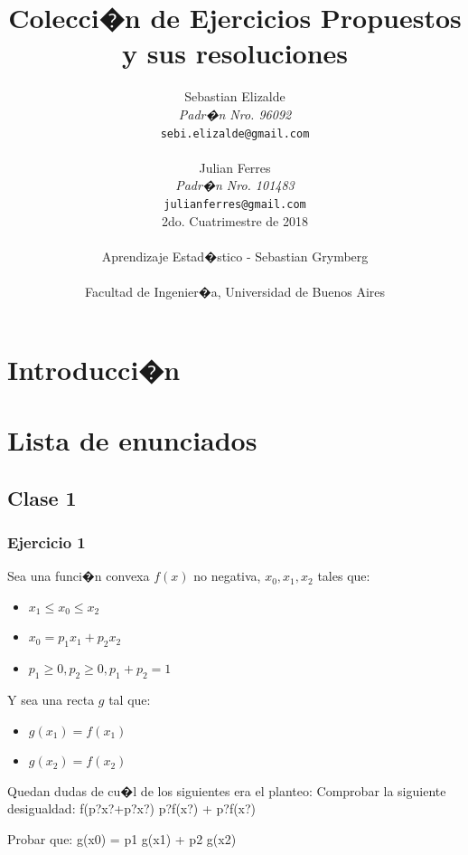 \documentclass[a4paper,10pt]{article}
\title{ \Huge \textbf{Colecci�n de Ejercicios Propuestos y sus resoluciones\\}}
\author{
	\Huge Sebastian Elizalde
	\\
	\LARGE \textit{Padr�n Nro. 96092}        \\
	\LARGE    \texttt{sebi.elizalde@gmail.com}                                              \\[2.5ex]
	\\
	\Huge Julian Ferres
	\\
	\LARGE \textit{Padr�n Nro. 101483}                     \\
	\LARGE    \texttt{julianferres@gmail.com}                                              \\[2.5ex]
	\LARGE   2do. Cuatrimestre de 2018                                      \\        
	\\
	\LARGE  Aprendizaje Estad�stico - Sebastian Grymberg  \\        
	\\
	\LARGE  Facultad de Ingenier�a, Universidad de Buenos Aires            \\}
\date{}
\begin{document}
	\maketitle
	\thispagestyle{empty}
	\newpage
	\tableofcontents
	\newpage
	\section{Introducci�n}
	

	\section{Lista de enunciados}
	
	
	
	\subsection{Clase 1}
	
	\subsubsection{Ejercicio 1}
	
	Sea una funci�n convexa $f(x)$ no negativa, $x_0,x_1,x_2$ tales que:
	
	\begin{itemize}
		
		\item $x_1 \leq x_0 \leq x_2$
		
		\item $x_0 = p_1x_1+p_2x_2$ 
		
		\item $p_1 \geq 0 , p_2 \geq 0 , p_1+p_2=1$ 
		
	\end{itemize}
	
	
	Y sea una recta $g$ tal que:
	
	\begin{itemize}
		
		\item $g(x_1) = f(x_1)$
			
		\item $g(x_2) = f(x_2)$
	
	\end{itemize}
	
	
	Quedan dudas de cu�l de los siguientes era el planteo:
	Comprobar la siguiente desigualdad:
	f(p?x?+p?x?) p?f(x?) + p?f(x?) 
	
	Probar que:
	g(x0) = p1 g(x1) + p2 g(x2) 
	
\end{document}
